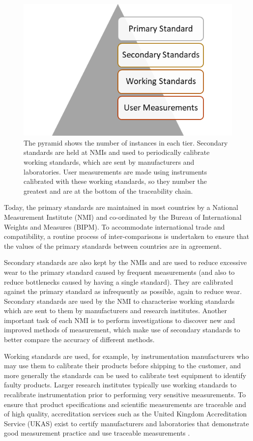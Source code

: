 \documentclass[../thesis/thesis.tex]{subfiles}
\begin{document}
\begin{refsection}
\begin{figure}
	\centering
	\includegraphics[]{traceability}
	\caption{The pyramid shows the number of instances in each tier. Secondary standards are held at NMIs and used to periodically calibrate working standards, which are sent by manufacturers and laboratories. User measurements are made using instruments calibrated with these working standards, so they number the greatest and are at the bottom of the traceability chain.}
	\label{ch3_fig_traceability}
\end{figure}

Today, the primary standards are maintained in most countries by a National Measurement Institute (NMI) and co-ordinated by the Bureau of International Weights and Measures (BIPM). To accommodate international trade and compatibility, a routine process of inter-comparisons is undertaken to ensure that the values of the primary standards between countries are in agreement.

Secondary standards are also kept by the NMIs and are used to reduce excessive wear to the primary standard caused by frequent measurements (and also to reduce bottlenecks caused by having a single standard). They are calibrated against the primary standard as infrequently as possible, again to reduce wear. Secondary standards are used by the NMI to characterise working standards which are sent to them by manufacturers and research institutes. Another important task of each NMI is to perform investigations to discover new and improved methods of measurement, which make use of secondary standards to better compare the accuracy of different methods.

Working standards are used, for example, by instrumentation manufacturers who may use them to calibrate their products before shipping to the customer, and more generally the standards can be used to calibrate test equipment to identify faulty products. Larger research institutes typically use working standards to recalibrate instrumentation prior to performing very sensitive measurements. To ensure that product specifications and scientific measurements are traceable and of high quality, accreditation services such as the United Kingdom Accreditation Service (UKAS) exist to certify manufacturers and laboratories that demonstrate good measurement practice and use traceable measurements \cite{UKAS}.


\end{refsection}
\end{document}
